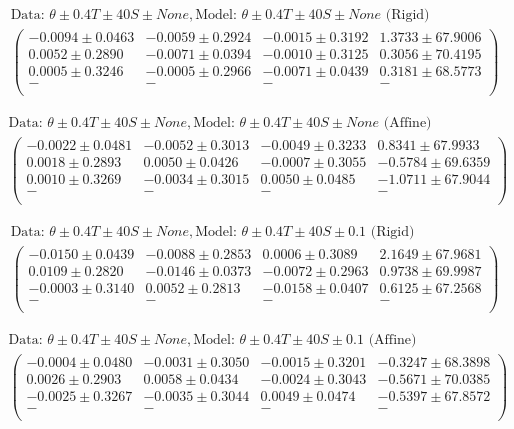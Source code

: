 \begin{align*}
\text{Data: }\theta\pm0.4 T\pm40 S\pm None, \text{Model: }\theta\pm0.4 T\pm40 S\pm None \text{ (Rigid)} \\
\begin{pmatrix}
-0.0094 \pm 0.0463 & -0.0059 \pm 0.2924 & -0.0015 \pm 0.3192 &  1.3733 \pm 67.9006 \\
 0.0052 \pm 0.2890 & -0.0071 \pm 0.0394 & -0.0010 \pm 0.3125 &  0.3056 \pm 70.4195 \\
 0.0005 \pm 0.3246 & -0.0005 \pm 0.2966 & -0.0071 \pm 0.0439 &  0.3181 \pm 68.5773 \\
 - &  - &  - & - \\
\end{pmatrix}
\end{align*}

\begin{align*}
\text{Data: }\theta\pm0.4 T\pm40 S\pm None, \text{Model: }\theta\pm0.4 T\pm40 S\pm None \text{ (Affine)} \\
\begin{pmatrix}
-0.0022 \pm 0.0481 & -0.0052 \pm 0.3013 & -0.0049 \pm 0.3233 &  0.8341 \pm 67.9933 \\
 0.0018 \pm 0.2893 &  0.0050 \pm 0.0426 & -0.0007 \pm 0.3055 & -0.5784 \pm 69.6359 \\
 0.0010 \pm 0.3269 & -0.0034 \pm 0.3015 &  0.0050 \pm 0.0485 & -1.0711 \pm 67.9044 \\
 - &  - &  - & - \\
\end{pmatrix}
\end{align*}

\begin{align*}
\text{Data: }\theta\pm0.4 T\pm40 S\pm None, \text{Model: }\theta\pm0.4 T\pm40 S\pm0.1 \text{ (Rigid)} \\
\begin{pmatrix}
-0.0150 \pm 0.0439 & -0.0088 \pm 0.2853 &  0.0006 \pm 0.3089 &  2.1649 \pm 67.9681 \\
 0.0109 \pm 0.2820 & -0.0146 \pm 0.0373 & -0.0072 \pm 0.2963 &  0.9738 \pm 69.9987 \\
-0.0003 \pm 0.3140 &  0.0052 \pm 0.2813 & -0.0158 \pm 0.0407 &  0.6125 \pm 67.2568 \\
 - &  - &  - & - \\
\end{pmatrix}
\end{align*}

\begin{align*}
\text{Data: }\theta\pm0.4 T\pm40 S\pm None, \text{Model: }\theta\pm0.4 T\pm40 S\pm0.1 \text{ (Affine)} \\
\begin{pmatrix}
-0.0004 \pm 0.0480 & -0.0031 \pm 0.3050 & -0.0015 \pm 0.3201 & -0.3247 \pm 68.3898 \\
 0.0026 \pm 0.2903 &  0.0058 \pm 0.0434 & -0.0024 \pm 0.3043 & -0.5671 \pm 70.0385 \\
-0.0025 \pm 0.3267 & -0.0035 \pm 0.3044 &  0.0049 \pm 0.0474 & -0.5397 \pm 67.8572 \\
 - &  - &  - & - \\
\end{pmatrix}
\end{align*}
